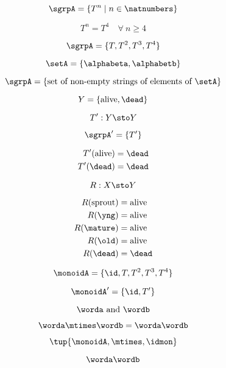 {\begin{forslides}
  
  $$\sgrpA = \{ T^n \mid n \in \natnumbers \}$$
  
$$ T^n = T^4 \quad \forall \ n \geq 4 $$

  $$\sgrpA = \{T, T^2, T^3, T^4 \}$$
  
  $$  \setA = \{ \alphabeta, \alphabetb \}$$
  
  $$\sgrpA = \{ \text{set of non-empty strings of elements of }\setA\}$$
  
  $$Y = \{ \text{alive}, \dead \}$$
  
  $$ T' : Y \sto Y $$
  
  $$\sgrpA' = \{T' \}$$
  
  
   \begin{align*}
    T'(\text{alive}) &=  \dead \\
    T' (\dead) &= \dead
  \end{align*}
  
  $$ R: X \sto Y $$
  
    \begin{align*}
    R(\text{sprout}) &= \text{alive} \\
    R(\yng) &=  \text{alive} \\
    R(\mature) &= \text{alive}\\
    R( \old) &= \text{alive} \\
    R (\dead) &= \dead
  \end{align*}
  
   $$\monoidA = \{ \id, T, T^2, T^3, T^4 \}$$
   
   $$\monoidA' = \{ \id, T' \}$$
  
  \begin{equation*}
    \worda \text{ and } \wordb
  \end{equation*}

  \begin{equation*}  \label{eq:string-semigroup-wordab}
    \worda \mtimes  \wordb =  \worda \wordb
  \end{equation*}
  
  
  $$ \tup{ \monoidA, \mtimes, \idmon} $$


  \begin{equation*} \label{eq:string-semigroup-wordab-concat}
     \worda \wordb
  \end{equation*}
  

  \end{forslides}}

  
